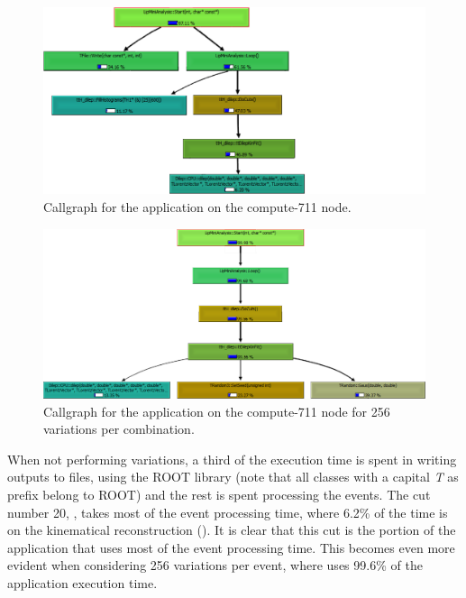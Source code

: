 \begin{figure}[!htp]
	\begin{center}
		\includegraphics[scale=0.6]{../../common/img/callgraph_start_1.png}
		\caption{Callgraph for the \tth application on the compute-711 node.}
		\label{fig:Callgraph1}
	\end{center}
\end{figure}

\begin{figure}[!htp]
	\begin{center}
		\includegraphics[scale=0.6]{../../common/img/callgraph_start_256.png}
		\caption{Callgraph for the \tth application on the compute-711 node for 256 variations per combination.}
		\label{fig:Callgraph256}
	\end{center}
\end{figure}

When not performing variations, a third of the execution time is spent in writing outputs to files, using the ROOT library (note that all classes with a capital \textit{T} as prefix belong to ROOT) and the rest is spent processing the events. The cut number 20, \ttDilepKinFit, takes most of the event processing time, where 6.2\% of the time is on the kinematical reconstruction (\dilep). It is clear that this cut is the portion of the application that uses most of the event processing time. This becomes even more evident when considering 256 variations per event, where \ttDilepKinFit uses 99.6\% of the application execution time.

